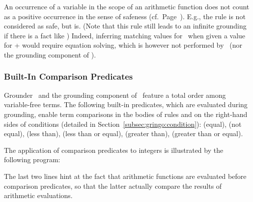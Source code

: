 \begin{Note}
An occurrence of a variable in the scope of an arithmetic function
does not count as a positive occurrence in the sense of safeness (cf.\ Page~\pageref{pg:safe}).
E.g., the rule 
is not considered as safe, but  is.
(Note that this rule still leads to an infinite grounding
 if there is a fact like )
Indeed, inferring matching values for~ when given a value for +
would require equation solving, which is however not performed by
\gringo\ (nor the grounding component of \clingo).
%
\end{Note}

\subsubsection{Built-In Comparison Predicates}\label{subsec:gringo:comp}

Grounder \gringo\ and the grounding component of \clingo\ 
feature a total order among variable-free terms.
The following built-in predicates, which are evaluated during grounding, 
enable term comparisons in the bodies of rules and on the right-hand sides of conditions
(detailed in Section~\ref{subsec:gringo:condition}):
\code{==} (equal),
\code{!=} (not equal),
\code{<} (less than),
\code{<=} (less than or equal),
\code{>} (greater than),
\code{>=} (greater than or equal).

\begin{example}\label{ex:arith:pred}
The application of comparison predicates to integers
is illustrated by the following program:%
%

%
The last two lines hint at the fact that arithmetic functions are evaluated
before comparison predicates, so that the latter actually compare the
results of arithmetic evaluations.
\eexample
\end{example}

